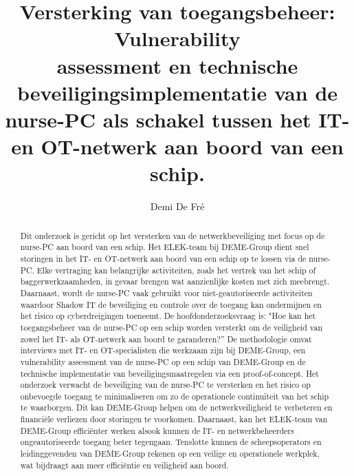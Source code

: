 \documentclass{hogent-article}
\title{Versterking van toegangsbeheer: Vulnerability \\ assessment en technische beveiligingsimplementatie van de nurse-PC als schakel tussen het IT- en OT-netwerk aan boord van een schip.}
\author{Demi De Fré}
\begin{document}
\begin{abstract}
  Dit onderzoek is gericht op het versterken van de netwerkbeveiliging met focus op de nurse-PC aan boord van een schip. Het ELEK-team bij DEME-Group 
  dient snel storingen in het IT- en OT-netwerk aan boord van een schip  op te lossen via de nurse-PC. Elke vertraging kan belangrijke activiteiten, 
  zoals het vertrek van het schip of baggerwerkzaamheden, in gevaar brengen wat aanzienlijke kosten met zich meebrengt. Daarnaast, wordt de nurse-PC vaak 
  gebruikt voor niet-geautoriseerde activiteiten waardoor Shadow IT de beveiliging en controle over de toegang kan ondermijnen en het risico op cyberdreigingen 
  toeneemt. De hoofdonderzoeksvraag is: "Hoe kan het toegangsbeheer van de nurse-PC op een schip worden versterkt om de veiligheid van zowel het IT- als OT-netwerk 
  aan boord te garanderen?” De methodologie omvat interviews met IT- en OT-specialisten die werkzaam zijn bij DEME-Group, een vulnerability assessment van 
  de nurse-PC op een schip van DEME-Group en de technische implementatie van beveiligingsmaatregelen via een proof-of-concept. Het onderzoek verwacht de 
  beveiliging van de nurse-PC te versterken en het risico op onbevoegde toegang te minimaliseren om zo de operationele continuïteit van het schip te waarborgen. 
  Dit kan DEME-Group helpen om de netwerkveiligheid te verbeteren en financiële verliezen door storingen te voorkomen. Daarnaast, kan het ELEK-team van DEME-Group 
  efficiënter werken alsook kunnen de  IT- en netwerkbeheerders ongeautoriseerde toegang beter tegengaan. Tenslotte kunnen de scheepsoperators en leidinggevenden 
  van DEME-Group rekenen op een veilige en operationele werkplek, wat bijdraagt aan meer efficiëntie en veiligheid aan boord.
\end{abstract}

\tableofcontents


\end{document}
